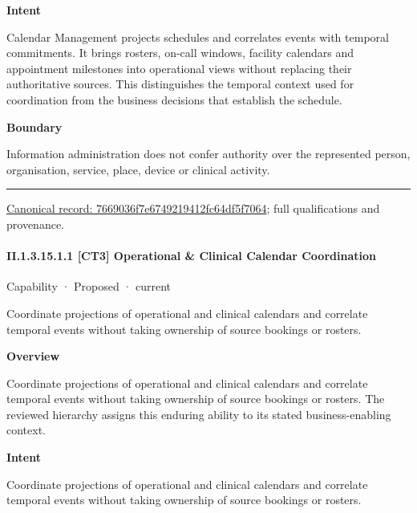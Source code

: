 \textbf{Intent}



Calendar Management projects schedules and correlates events with temporal commitments. It brings rosters, on-call windows, facility calendars and appointment milestones into operational views without replacing their authoritative sources. This distinguishes the temporal context used for coordination from the business decisions that establish the schedule.



\textbf{Boundary}



Information administration does not confer authority over the represented person, organisation, service, place, device or clinical activity.



\medskip\hrule\medskip

{\footnotesize \href{../../../../continuum/strategy/capability/7669036f7e6749219412fc64df5f7064.md}{Canonical record: 7669036f7e6749219412fc64df5f7064}; full qualifications and provenance.}\par
\paragraph*{II.1.3.15.1.1 [CT3] Operational \& Clinical Calendar Coordination}
\label{navigation:II.1.3.15.1.1}

\label{element:f6d8f1310ba543f69e8b57bf05603db3}
{\small Capability · Proposed · current}\par

Coordinate projections of operational and clinical calendars and correlate temporal events without taking ownership of source bookings or rosters.



\textbf{Overview}



Coordinate projections of operational and clinical calendars and correlate temporal events without taking ownership of source bookings or rosters. The reviewed hierarchy assigns this enduring ability to its stated business-enabling context.



\textbf{Intent}



Coordinate projections of operational and clinical calendars and correlate temporal events without taking ownership of source bookings or rosters.



